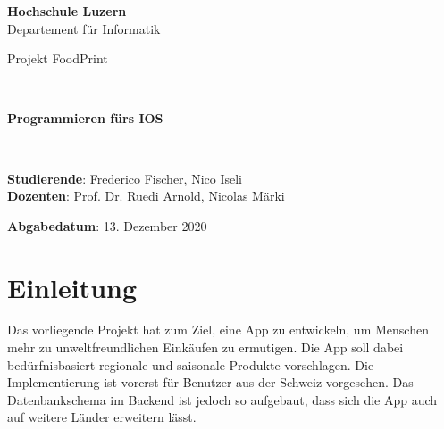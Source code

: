 \documentclass[12pt,titlepage]{article}
\begin{document}
\thispagestyle{empty}

\begin{center}
\textbf{Hochschule Luzern}\\
Departement für Informatik\\[12\baselineskip]

\begin{Huge}
Projekt FoodPrint
\end{Huge} \\[6\baselineskip]

\begin{large}
\textbf{Programmieren fürs IOS}
\end{large} \\[6\baselineskip]

\begin{large}
\textbf{Studierende}: Frederico Fischer, Nico Iseli\\
\textbf{Dozenten}: Prof. Dr. Ruedi Arnold, Nicolas Märki\

\textbf{Abgabedatum}: 13. Dezember 2020 \\ 
\end{large}
\end{center}
\newpage


\section*{Einleitung}
Das vorliegende Projekt hat zum Ziel, eine App zu entwickeln, um Menschen mehr zu unweltfreundlichen Einkäufen zu ermutigen. Die App soll dabei bedürfnisbasiert regionale und saisonale Produkte vorschlagen. Die Implementierung ist vorerst für Benutzer aus der Schweiz vorgesehen. Das Datenbankschema im Backend ist jedoch so aufgebaut, dass sich die App auch auf weitere Länder erweitern lässt.
\end{document}
